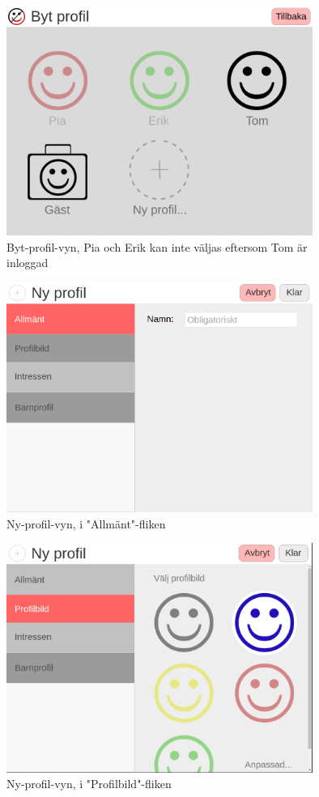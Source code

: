 \documentclass[a4paper,12pt,titlepage]{article}
\begin{document}
\begin{figure}[h]
    \centering
    \includegraphics[width=10cm]{../screenshots/switch_profile.png}
    \caption{Byt-profil-vyn, Pia och Erik kan inte väljas eftersom Tom är
    inloggad}
\end{figure}

\begin{figure}[h]
    \centering
    \includegraphics[width=10cm]{../screenshots/new_profile_general.png}
    \caption{Ny-profil-vyn, i "Allmänt"-fliken}
\end{figure}

\begin{figure}[h]
    \centering
    \includegraphics[width=10cm]{../screenshots/new_profile_pic.png}
    \caption{Ny-profil-vyn, i "Profilbild"-fliken}
\end{figure}
\end{document}
